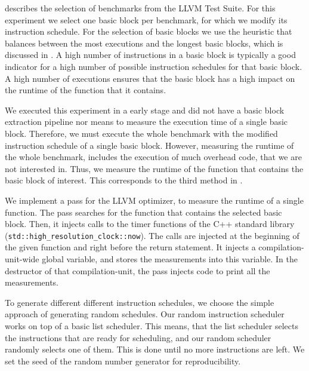  describes the selection of benchmarks from the LLVM Test Suite.
For this experiment we select one basic block per benchmark, for which we modify its instruction schedule.
For the selection of basic blocks we use the heuristic that balances between the most executions and the longest basic blocks, which is discussed in .
A high number of instructions in a basic block is typically a good indicator for a high number of possible instruction schedules for that basic block. 
A high number of executions ensures that the basic block has a high impact on the runtime of the function that it contains.

We executed this experiment in a early stage and did not have a basic block extraction pipeline nor means to measure the execution time of a single basic block.
Therefore, we must execute the whole benchmark with the modified instruction schedule of a single basic block.
However, measuring the runtime of the whole benchmark, includes the execution of much overhead code, that we are not interested in.
Thus, we measure the runtime of the function that contains the basic block of interest.
This corresponds to the third method in .

We implement a pass for the LLVM optimizer, to measure the runtime of a single function.
The pass searches for the function that contains the selected basic block.
Then, it injects calls to the timer functions of the C++ standard library (\lstinline|std::high_resolution_clock::now|).
The calls are injected at the beginning of the given function and right before the return statement.
It injects a compilation-unit-wide global variable, and stores the measurements into this variable.
In the destructor of that compilation-unit, the pass injects code to print all the measurements.

To generate different different instruction schedules, we choose the simple approach of generating random schedules.
Our random instruction scheduler works on top of a basic list scheduler.
This means, that the list scheduler selects the instructions that are ready for scheduling, and our random scheduler randomly selects one of them.
This is done until no more instructions are left.
We set the seed of the random number generator for reproducibility.

